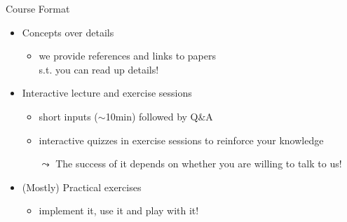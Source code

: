 \begin{frame}[c]{Course Format}
	
	\begin{itemize}
		\item Concepts over details
		\begin{itemize}
			\item we provide references and links to papers\\ s.t. you can read up details!
		\end{itemize}
		\smallskip
		\item Interactive lecture and exercise sessions
		\begin{itemize}
			\item short inputs ($\sim$10min) followed by Q\&A
			\item interactive quizzes in exercise sessions to reinforce your knowledge
			\item[$\leadsto$] The success of it depends on whether you are willing to talk to us! 
		\end{itemize}
		\smallskip
		\item (Mostly) Practical exercises
		\begin{itemize}
			\item implement it, use it and play with it!
		\end{itemize}
	\end{itemize}
	
\end{frame}
